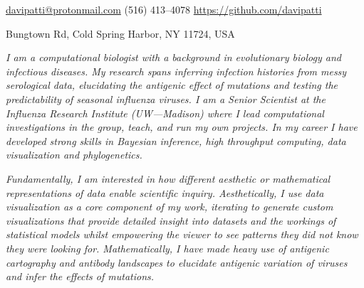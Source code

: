 \documentclass[10pt,a4paper]{article}
\begin{document}
\sloppy  %


\nobreakvspace{0.3em}  %

\noindent\href{mailto:davipatti@protonmail.com}{davipatti\mbox{}@\mbox{}protonmail.com}\sbull
{} (516) 413--4078\sbull
\href{https://github.com/davipatti}{https://github.com/davipatti}
\par {} Bungtown Rd, Cold Spring Harbor, NY 11724, USA

\spacedhrule{0.5em}{-0.4em}  %

 \begin{multicols}{2} 
    
  \emph{ I am a computational biologist with a background in evolutionary biology and
  infectious diseases. My research spans inferring infection histories from messy
  serological data, elucidating the antigenic effect of mutations and testing the
  predictability of seasonal influenza viruses. I am a Senior Scientist at the Influenza
  Research Institute (UW---Madison) where I lead computational investigations in the
  group, teach, and run my own projects. In my career I have developed strong skills in
  Bayesian inference, high throughput computing, data visualization and phylogenetics. }
  
  \emph{ Fundamentally, I am interested in how different aesthetic or mathematical
  representations of data enable scientific inquiry. Aesthetically, I use data
  visualization as a core component of my work, iterating to generate custom
  visualizations that provide detailed insight into datasets and the workings of
  statistical models whilst empowering the viewer to see patterns they did not know they
  were looking for. Mathematically, I have made heavy use of antigenic cartography and
  antibody landscapes to elucidate antigenic variation of viruses and infer the effects
  of mutations. }
\end{multicols}

\spacedhrule{0.9em}{-0.4em}

\end{document}
